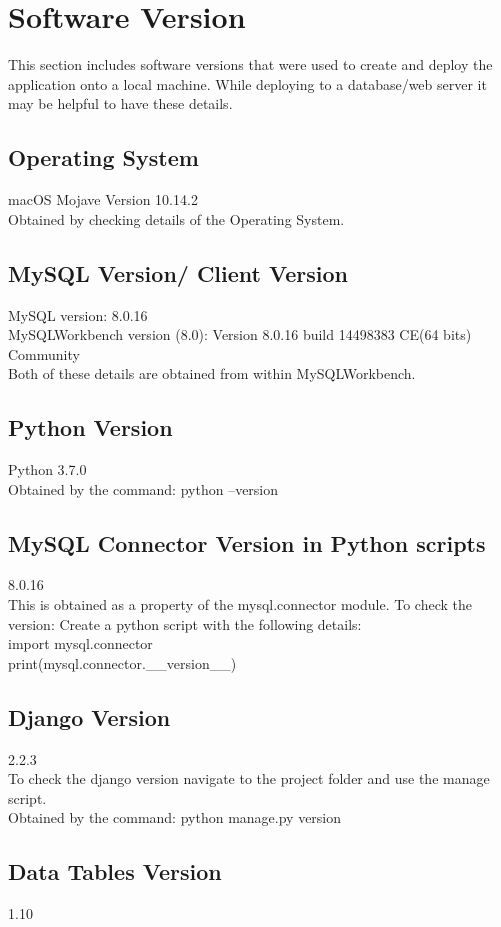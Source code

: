 \documentclass[msc,deptreport,ai]{infthesis}      %
\begin{document}



 \appendix
% 
\chapter{Software Version}
% 
This section includes software versions that were used to create and deploy the application onto a local machine. While deploying to a database/web server it may be helpful to have these details.
 \section{Operating System}
 macOS Mojave Version 10.14.2\\
 Obtained by checking details of the Operating System.
 \section{MySQL Version/ Client Version}
 MySQL version: 8.0.16\\
 MySQLWorkbench version (8.0): Version 8.0.16 build 14498383 CE(64 bits) Community\\
 Both of these details are obtained from within MySQLWorkbench.
 \section{Python Version}
 Python 3.7.0\\
 Obtained by the command: python --version
 \section{MySQL Connector Version in Python scripts}
 8.0.16\\
 This is obtained as a property of the mysql.connector module.
 To check the version:
 Create a python script with the following details:\\
 import mysql.connector\\
 print(mysql.connector.\_\_version\_\_)\\
 \section{Django Version}
 2.2.3\\
 To check the django version navigate to the project folder and use the manage script.\\
  Obtained by the command: python manage.py version
 \section{Data Tables Version}
 1.10
 
\end{document}
